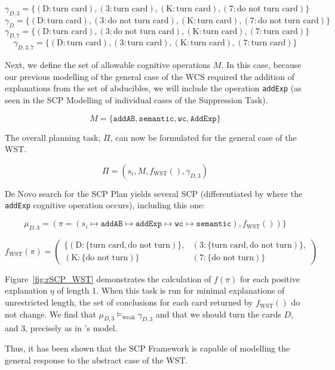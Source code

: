 \[\gamma_{D,3}=\{(\text{D}:\text{turn card}),(\text{3}:\text{turn card}),(\text{K}:\text{turn card}),(\text{7}:\text{do not turn card})\}\]
\[\gamma_{D}=\{(\text{D}:\text{turn card}),(\text{3}:\text{do not turn card}),(\text{K}:\text{turn card}),(\text{7}:\text{do not turn card})\}\]
\[\gamma_{D,7}=\{(\text{D}:\text{turn card}),(\text{3}:\text{do not turn card}),(\text{K}:\text{turn card}),(\text{7}:\text{turn card})\}\]
\[\gamma_{D,3,7}=\{(\text{D}:\text{turn card}),(\text{3}:\text{turn card}),(\text{K}:\text{turn card}),(\text{7}:\text{turn card})\}\]

Next, we define the set of allowable cognitive operations $M$. In this case, because our previous modelling of the general case of the WCS required the addition of explanations from the set of abducibles, we will include the operation \texttt{addExp} (as seen in the SCP Modelling of individual cases of the Suppression Task).

\[M=\{\texttt{addAB}, \texttt{semantic}, \texttt{wc}, \texttt{AddExp}\}\]

The overall planning task, $\Pi$, can now be formulated for the general case of the WST.

\[\Pi=(s_i,M,f_\text{WST}(),\gamma_{D,3})\]

De Novo search for the SCP Plan yields several SCP (differentiated by where the \texttt{addExp} cognitive operation occurs), including this one:

\[\mu_{D,3}=(\pi=(s_i\longmapsto \texttt{addAB} \longmapsto \texttt{addExp} \longmapsto \texttt{wc} \longmapsto \texttt{semantic}),f_\text{WST}())\}\]

\[
f_\text{WST}(\pi)=
\begin{pmatrix}
\{(\text{D}:\{\text{turn card},\text{do not turn})\}, & 
(\text{3}:\{\text{turn card},\text{do not turn})\}, \\
(\text{K}:\{\text{do not turn})\} &
(\text{7}:\{\text{do not turn})\}
\end{pmatrix}
\]



Figure~\ref{fig:rSCP_WST} demonstrates the calculation of $f(\pi)$ for each positive explanation $\eta$ of length 1. When this task is run for minimal explanations of unrestricted length, the set of conclusions for each card returned by $f_\text{WST}()$ do not change. We find that $\mu_{D,3}\models_\text{weak} \gamma_{D,3}$ and that we should turn the cards $D$, and $3$, precisely as in \cite{dietz2014modeling}'s model.

Thus, it has been shown that the SCP Framework is capable of modelling the general response to the abstract case of the WST.


